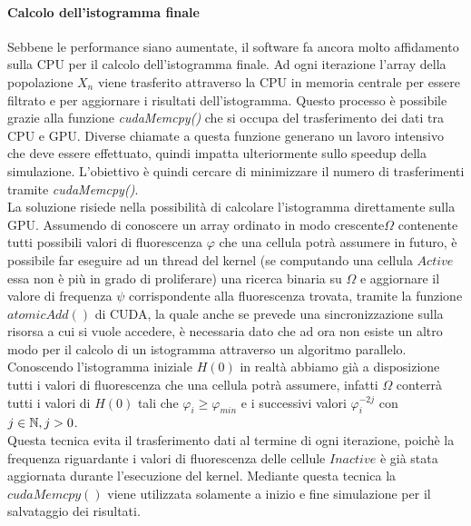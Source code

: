 \paragraph{Calcolo dell'istogramma finale}

Sebbene le performance siano aumentate, il software fa ancora molto affidamento
sulla CPU per il calcolo dell'istogramma finale.
Ad ogni iterazione l'array della popolazione $X_{n}$ viene trasferito
attraverso la CPU in memoria centrale per essere filtrato e per aggiornare i
risultati dell'istogramma. Questo processo è possibile grazie alla funzione
\textit{cudaMemcpy()} che si occupa del trasferimento dei dati tra CPU e GPU.
Diverse chiamate a questa funzione generano un lavoro intensivo che deve essere
effettuato, quindi impatta ulteriormente sullo speedup della simulazione.
L'obiettivo è quindi cercare di minimizzare il numero di trasferimenti tramite
\textit{cudaMemcpy()}.
\\
La soluzione risiede nella possibilità di calcolare l'istogramma direttamente
sulla GPU. Assumendo di conoscere un array ordinato in modo crescente$\Omega$
contenente tutti possibili valori di fluorescenza
$\varphi$ che una cellula potrà assumere in futuro, è possibile far eseguire
ad un thread del kernel (se computando una cellula $Active$ essa non è più in
grado di proliferare) una ricerca binaria su $\Omega$ e aggiornare
il valore di frequenza $\psi$ corrispondente alla fluorescenza trovata, tramite
la funzione $atomicAdd()$ di CUDA, la quale anche se prevede una
sincronizzazione sulla risorsa a cui si vuole accedere, è necessaria dato che
ad ora non esiste un altro modo per il calcolo di un istogramma attraverso un
algoritmo parallelo.
\\
Conoscendo l'istogramma iniziale $H(0)$ in realtà abbiamo già a disposizione
tutti i valori di fluorescenza che una cellula potrà assumere, infatti
$\Omega$ conterrà tutti i valori di $H(0)$ tali che $\varphi_{i} \geqslant
\varphi_{min}$ e i successivi valori $\varphi_{i}^{-2j}$ con $j \in \mathbb{N}, j > 0$.
\\
Questa tecnica evita il trasferimento dati al termine di ogni iterazione, poichè
la frequenza riguardante i valori di fluorescenza delle cellule $Inactive$
è già stata aggiornata durante l'esecuzione del kernel.
Mediante questa tecnica la $cudaMemcpy()$ viene utilizzata solamente a inizio
e fine simulazione per il salvataggio dei risultati.

\begin{figure}[H]
    \centering
    \caption{}
\end{figure}

